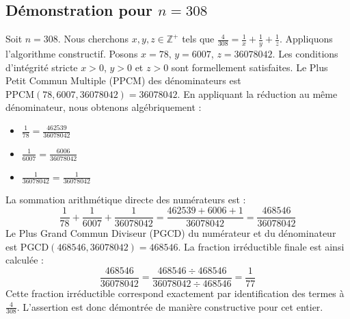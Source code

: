 \documentclass[11pt,a4paper]{article}
\begin{document}
\subsection{Démonstration pour $n = 308$}
Soit $n = 308$. Nous cherchons $x, y, z \in \mathbb{Z}^{+}$ tels que $\frac{4}{308} = \frac{1}{x} + \frac{1}{y} + \frac{1}{z}$.
Appliquons l'algorithme constructif. Posons $x = 78$, $y = 6007$, $z = 36078042$.
Les conditions d'intégrité stricte $x > 0$, $y > 0$ et $z > 0$ sont formellement satisfaites.
Le Plus Petit Commun Multiple (PPCM) des dénominateurs est $\text{PPCM}(78, 6007, 36078042) = 36078042$.
En appliquant la réduction au même dénominateur, nous obtenons algébriquement :
\begin{itemize}
    \item $\frac{1}{78} = \frac{462539}{36078042}$
    \item $\frac{1}{6007} = \frac{6006}{36078042}$
    \item $\frac{1}{36078042} = \frac{1}{36078042}$
\end{itemize}
La sommation arithmétique directe des numérateurs est :
$$ \frac{1}{78} + \frac{1}{6007} + \frac{1}{36078042} = \frac{462539 + 6006 + 1}{36078042} = \frac{468546}{36078042} $$
Le Plus Grand Commun Diviseur (PGCD) du numérateur et du dénominateur est $\text{PGCD}(468546, 36078042) = 468546$.
La fraction irréductible finale est ainsi calculée :
$$ \frac{468546}{36078042} = \frac{468546 \div 468546}{36078042 \div 468546} = \frac{1}{77} $$
Cette fraction irréductible correspond exactement par identification des termes à $\frac{4}{308}$. L'assertion est donc démontrée de manière constructive pour cet entier.
\end{document}
